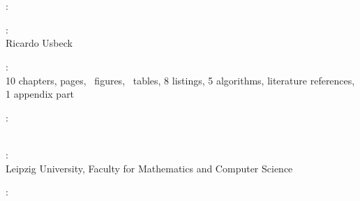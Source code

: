 \thispagestyle{empty}

\hfill

\vfill

~\\
\noindent{}\\



\noindent{}: \\
\myTitle 

\medskip

\noindent{}: \\
Ricardo Usbeck %

\medskip

\noindent{}: \\
10 chapters, \pageref*{LastPages} pages, \totfig\ figures, \tottab\ tables, 8 listings, 5 algorithms,  literature references,  1 appendix part

\medskip

\noindent{}: \\
\myProf \\
\mySupervisor

\medskip

\noindent{}: \\
Leipzig University, Faculty for Mathematics and Computer Science

\medskip

\noindent{}: \\
\myTime
